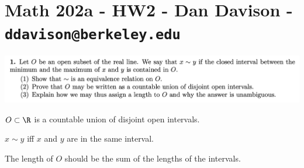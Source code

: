 \section*{Math 202a - HW2 - Dan Davison - \texttt{ddavison@berkeley.edu}}


\begin{mdframed}
  \includegraphics[width=400pt]{img/analysis--berkeley-202a-ebe4.png}
\end{mdframed}

\begin{intuition*}
  $O \subset \R$ is a countable union of disjoint open intervals.

  $x \sim y$ iff $x$ and $y$ are in the same interval.

  The length of $O$ should be the sum of the lengths of the intervals.
\end{intuition*}


